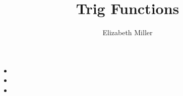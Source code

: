 \documentclass{ximera}
\author{Elizabeth Miller}
\title{Trig Functions}
\begin{document}
\begin{abstract}
\end{abstract}
\maketitle


\begin{objectives}

\item
\begin{itemize}
	\item 
	\item 
	\item 
\end{itemize}




\end{objectives}
\end{document}
